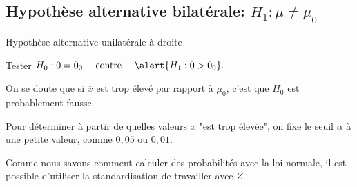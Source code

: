 \documentclass{BeamerTemplate}
\begin{document}
\subsection{Hypothèse alternative bilatérale: $H_1 : \mu \ne \mu_0$}

\begin{frame}[t]{Hypothèse alternative unilatérale à droite}

\small
Tester $H_0 : \mu = \mu_0 \quad\mbox{ contre }\quad \alert{H_1 : \mu > \mu_0}.$

\bigskip

On se doute que \alert{si $\overline{x}$ est trop élevé par rapport à $\mu_0$}, c'est que $H_0$  est probablement fausse.

\bigskip

Pour déterminer à partir de quelles valeurs $\overline x$ "est trop élevée", on
fixe le seuil $\alpha$ à une petite valeur, comme $0,05$ ou $0,01$.
\medskip

Comme nous savons comment calculer des probabilités avec la loi normale, il est possible d'utiliser la standardisation de travailler avec $Z$.

\medskip



\end{frame}
\end{document}
